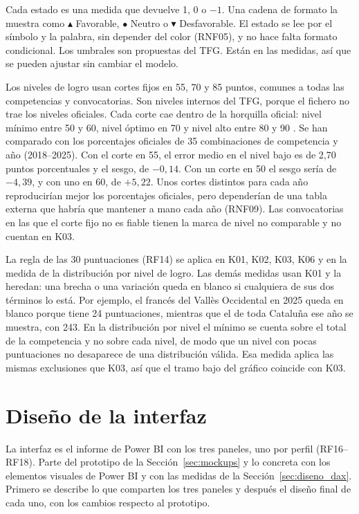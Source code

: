\documentclass[12pt, a4paper, oneside]{report}
\begin{document}
Cada estado es una medida que devuelve 1, 0 o $-1$. Una cadena de formato la muestra como \guillemotleft{}$\blacktriangle$ Favorable\guillemotright{}, \guillemotleft{}$\bullet$ Neutro\guillemotright{} o \guillemotleft{}$\blacktriangledown$ Desfavorable\guillemotright{}. El estado se lee por el símbolo y la palabra, sin depender del color (RNF05), y no hace falta formato condicional. Los umbrales son propuestas del TFG. Están en las medidas, así que se pueden ajustar sin cambiar el modelo.

Los niveles de logro usan cortes fijos en 55, 70 y 85 puntos, comunes a todas las competencias y convocatorias. Son niveles internos del TFG, porque el fichero no trae los niveles oficiales. Cada corte cae dentro de la horquilla oficial: nivel mínimo entre 50 y 60, nivel óptimo en 70 y nivel alto entre 80 y 90 \cite{csase_resultats}. Se han comparado con los porcentajes oficiales de 35 combinaciones de competencia y año (2018--2025). Con el corte en 55, el error medio en el nivel bajo es de 2,70 puntos porcentuales y el sesgo, de $-0{,}14$. Con un corte en 50 el sesgo sería de $-4{,}39$, y con uno en 60, de $+5{,}22$. Unos cortes distintos para cada año reproducirían mejor los porcentajes oficiales, pero dependerían de una tabla externa que habría que mantener a mano cada año (RNF09). Las convocatorias en las que el corte fijo no es fiable tienen la marca de nivel no comparable y no cuentan en K03.

La regla de las 30 puntuaciones (RF14) se aplica en K01, K02, K03, K06 y en la medida de la distribución por nivel de logro. Las demás medidas usan K01 y la heredan: una brecha o una variación queda en blanco si cualquiera de sus dos términos lo está. Por ejemplo, el francés del Vallès Occidental en 2025 queda en blanco porque tiene 24 puntuaciones, mientras que el de toda Cataluña ese año se muestra, con 243. En la distribución por nivel el mínimo se cuenta sobre el total de la competencia y no sobre cada nivel, de modo que un nivel con pocas puntuaciones no desaparece de una distribución válida. Esa medida aplica las mismas exclusiones que K03, así que el tramo bajo del gráfico coincide con K03.

\section{Diseño de la interfaz}
\label{sec:diseno_interfaz}
La interfaz es el informe de Power BI con los tres paneles, uno por perfil (RF16--RF18). Parte del prototipo de la Sección~\ref{sec:mockups} y lo concreta con los elementos visuales de Power BI y con las medidas de la Sección~\ref{sec:diseno_dax}. Primero se describe lo que comparten los tres paneles y después el diseño final de cada uno, con los cambios respecto al prototipo.
\end{document}
